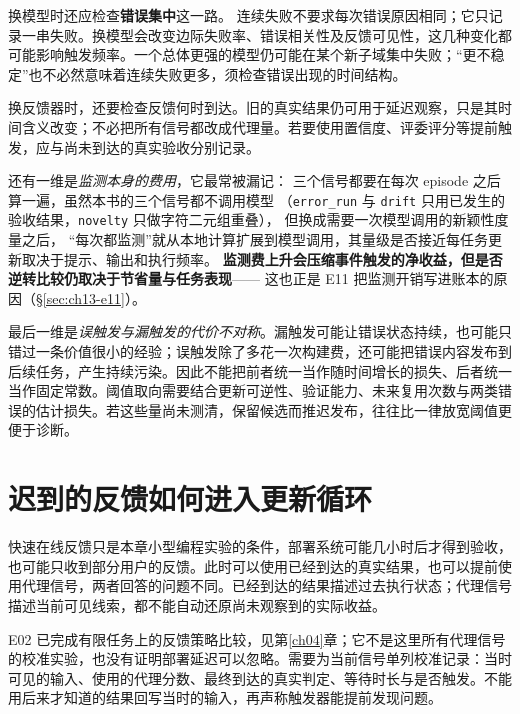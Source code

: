 换模型时还应检查\textbf{错误集中}这一路。
连续失败不要求每次错误原因相同；它只记录一串失败。换模型会改变边际失败率、错误相关性及反馈可见性，这几种变化都可能影响触发频率。一个总体更强的模型仍可能在某个新子域集中失败；“更不稳定”也不必然意味着连续失败更多，须检查错误出现的时间结构。

换反馈器时，还要检查反馈何时到达。旧的真实结果仍可用于延迟观察，只是其时间含义改变；不必把所有信号都改成代理量。若要使用置信度、评委评分等提前触发，应与尚未到达的真实验收分别记录。

\begin{sloppypar}
还有一维是\emph{监测本身的费用}，它最常被漏记：
三个信号都要在每次 episode 之后算一遍，虽然本书的三个信号都不调用模型
（\texttt{error\_run} 与 \texttt{drift} 只用已发生的验收结果，\texttt{novelty} 只做字符二元组重叠），
但换成需要一次模型调用的新颖性度量之后，
“每次都监测”就从本地计算扩展到模型调用，其量级是否接近每任务更新取决于提示、输出和执行频率。
\textbf{监测费上升会压缩事件触发的净收益，但是否逆转比较仍取决于节省量与任务表现}——
这也正是 E11 把监测开销写进账本的原因（§\ref{sec:ch13-e11}）。
\end{sloppypar}

\begin{sloppypar}
最后一维是\emph{误触发与漏触发的代价不对称}。漏触发可能让错误状态持续，也可能只错过一条价值很小的经验；误触发除了多花一次构建费，还可能把错误内容发布到后续任务，产生持续污染。因此不能把前者统一当作随时间增长的损失、后者统一当作固定常数。阈值取向需要结合更新可逆性、验证能力、未来复用次数与两类错误的估计损失。若这些量尚未测清，保留候选而推迟发布，往往比一律放宽阈值更便于诊断。
\end{sloppypar}

\section{迟到的反馈如何进入更新循环}
\label{sec:ch13-feedback-clock}
\label{sec:ch13-delayed}

快速在线反馈只是本章小型编程实验的条件，部署系统可能几小时后才得到验收，也可能只收到部分用户的反馈。此时可以使用已经到达的真实结果，也可以提前使用代理信号，两者回答的问题不同。已经到达的结果描述过去执行状态；代理信号描述当前可见线索，都不能自动还原尚未观察到的实际收益。

E02 已完成有限任务上的反馈策略比较，见第\ref{ch04}章；它不是这里所有代理信号的校准实验，也没有证明部署延迟可以忽略。需要为当前信号单列校准记录：当时可见的输入、使用的代理分数、最终到达的真实判定、等待时长与是否触发。不能用后来才知道的结果回写当时的输入，再声称触发器能提前发现问题。

